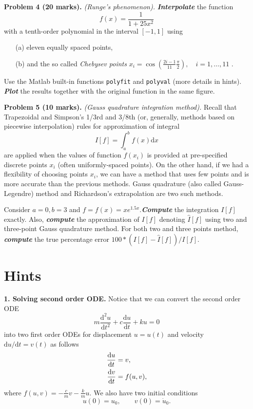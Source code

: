 \documentclass[11pt,a4paper]{article}
\newcommand{\dd}{\mathrm{d}}
\newcommand{\bfit}[1]{\textit{\textbf{#1}}}
\begin{document}
\vspace{10pt}
\noindent\textbf{Problem 4 (20 marks).} \textit{(Runge's phenomenon).} \bfit{Interpolate} the function
\begin{equation} \label{eqn:runge}
f(x) = \frac{1}{1+25x^2}
\end{equation}
with a tenth-order polynomial in the interval $[-1,1]$ using 
\begin{itemize}
\item[(a)] eleven equally spaced points,
\item[(b)] and the so called \emph{Chebysev points} $x_i = \cos\left(\frac{2i-1}{11}\frac{\pi}{2}\right), \quad i = 1,\ldots,11$ .
\end{itemize}
Use the Matlab built-in functions \texttt{polyfit} and \texttt{polyval} (more details in hints). \bfit{Plot} the results together with the original function in the same figure.

\vspace{10pt}
\noindent\textbf{Problem 5 (10 marks).} \textit{(Gauss quadrature integration method).} Recall that Trapezoidal and Simpson's 1/3rd and 3/8th (or, generally, methods based on piecewise interpolation) rules for approximation of integral 
\begin{equation}
I[f] = \int_a^b f(x) \dd x
\end{equation}
are applied when the values of function $f(x_i)$ is provided at pre-specified discrete points $x_i$ (often uniformly-spaced points). On the other hand, if we had a flexibility of choosing points $x_i$, we can have a method that uses few points and is more accurate than the previous methods. Gauss quadrature (also called Gauss-Legendre) method and Richardson's extrapolation are two such methods.

Consider $a = 0, b = 3$ and $f = f(x) = x e^{1.5x}$.\bfit{Compute} the integration $I[f]$ exactly. Also, \bfit{compute} the approximation of $I[f]$ denoting $\hat{I}[f]$ using two and three-point Gauss quadrature method. For both two and three points method, \bfit{compute} the true percentage error $100*(I[f] - \hat{I}[f])/I[f]$.


\section{Hints}
\noindent\textbf{1. Solving second order ODE.} Notice that we can convert the second order ODE
\begin{equation*}
m\frac{\dd^2 u}{\dd t^2} + c \frac{\dd u}{\dd t} + k u = 0
\end{equation*}
into two first order ODEs for displacement $u = u(t)$ and velocity $\dd u / \dd t = v(t)$ as follows
\begin{align}\label{eq:ode2}
\frac{\dd u}{\dd t} &= v, \notag \\
\frac{\dd v}{\dd t} &= f(u, v),
\end{align}
where $f(u, v) = -\frac{c}{m} v - \frac{k}{m} u$. We also have two initial conditions
\begin{equation*}
u(0) = u_0, \qquad v(0) = \dot{u}_0 .
\end{equation*}
\end{document}
